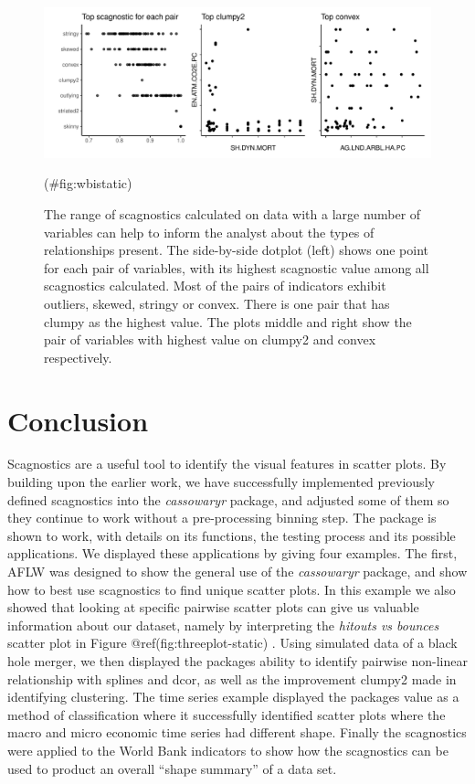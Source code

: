 \begin{Schunk}
\begin{figure}
\includegraphics[width=1\linewidth]{mason-lee-laa-cook_files/figure-latex/wbistatic-1} \caption[The range of scagnostics calculated on data with a large number of variables can help to inform the analyst about the types of relationships present]{The range of scagnostics calculated on data with a large number of variables can help to inform the analyst about the types of relationships present. The side-by-side dotplot (left) shows one point for each pair of variables, with its highest scagnostic value among all scagnostics calculated. Most of the pairs of indicators exhibit outliers, skewed, stringy or convex. There is one pair that has clumpy as the highest value. The plots middle and right show the pair of variables with highest value on clumpy2 and convex respectively.}(\#fig:wbistatic)
\end{figure}
\end{Schunk}

\hypertarget{conclusion}{%
\section{Conclusion}\label{conclusion}}

Scagnostics are a useful tool to identify the visual features in scatter
plots. By building upon the earlier work, we have successfully
implemented previously defined scagnostics into the \emph{cassowaryr}
package, and adjusted some of them so they continue to work without a
pre-processing binning step. The package is shown to work, with details
on its functions, the testing process and its possible applications. We
displayed these applications by giving four examples. The first, AFLW
was designed to show the general use of the \emph{cassowaryr} package,
and show how to best use scagnostics to find unique scatter plots. In
this example we also showed that looking at specific pairwise scatter
plots can give us valuable information about our dataset, namely by
interpreting the \emph{hitouts vs bounces} scatter plot in Figure
@ref(fig:threeplot-static) . Using simulated data of a black hole
merger, we then displayed the packages ability to identify pairwise
non-linear relationship with splines and dcor, as well as the
improvement clumpy2 made in identifying clustering. The time series
example displayed the packages value as a method of classification where
it successfully identified scatter plots where the macro and micro
economic time series had different shape. Finally the scagnostics were
applied to the World Bank indicators to show how the scagnostics can be
used to product an overall ``shape summary'' of a data set.

